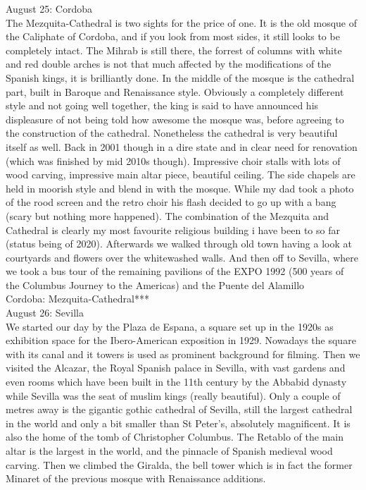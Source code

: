 August 25: Cordoba\\
The Mezquita-Cathedral is two sights for the price of one. It is the old mosque of the Caliphate of Cordoba, and if you look from most sides, it still looks to be completely intact. The Mihrab is still there, the forrest of columns with white and red double arches is not that much affected by the modifications of the Spanish kings, it is brilliantly done. In the middle of the mosque is the cathedral part, built in Baroque and Renaissance style. Obviously a completely different style and not going well together, the king is said to have announced his displeasure of not being told how awesome the mosque was, before agreeing to the construction of the cathedral. Nonetheless the cathedral is very beautiful itself as well. Back in 2001 though in a dire state and in clear need for renovation (which was finished by mid 2010s though). Impressive choir stalls with lots of wood carving, impressive main altar piece, beautiful ceiling. The side chapels are held in moorish style and blend in with the mosque. While my dad took a photo of the rood screen and the retro choir his flash decided to go up with a bang (scary but nothing more happened). The combination of the Mezquita and Cathedral is clearly my most favourite religious building i have been to so far (status being of 2020). Afterwards we walked through old town having a look at courtyards and flowers over the whitewashed walls. And then off to Sevilla, where we took a bus tour of the remaining pavilions of the EXPO 1992 (500 years of the Columbus Journey to the Americas) and the Puente del Alamillo\\ 

Cordoba: Mezquita-Cathedral***\\

August 26: Sevilla\\
We started our day by the Plaza de Espana, a square set up in the 1920s as exhibition space for the Ibero-American exposition in 1929. Nowadays the square with its canal and it towers is used as prominent background for filming. Then we visited the Alcazar, the Royal Spanish palace in Sevilla, with vast gardens and even rooms which have been built in the 11th century by the Abbabid dynasty while Sevilla was the seat of muslim kings (really beautiful). Only a couple of metres away is the gigantic gothic cathedral of Sevilla, still the largest cathedral in the world and only a bit smaller than St Peter's, absolutely magnificent. It is also the home of the tomb of Christopher Columbus. The Retablo of the main altar is the largest in the world, and the pinnacle of Spanish medieval wood carving. Then we climbed the Giralda, the bell tower which is in fact the former Minaret of the previous mosque with Renaissance additions. \\

